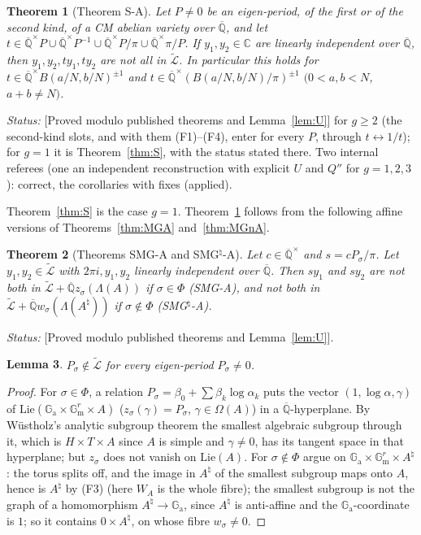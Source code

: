 \documentclass[11pt]{amsart}
\newtheorem{theorem}{Theorem}[section]
\newtheorem{lemma}[theorem]{Lemma}
\theoremstyle{definition}
\newcommand{\Qb}{\overline{\mathbb{Q}}}
\newcommand{\C}{\mathbb{C}}
\newcommand{\Ga}{\mathbb{G}_{\mathrm a}}
\newcommand{\Gm}{\mathbb{G}_{\mathrm m}}
\newcommand{\Lt}{\widetilde{\mathcal{L}}}
\newcommand{\lab}[1]{\textup{[#1]}}
\newcommand{\LabC}{\lab{Proved modulo published theorems and Lemma~\ref{lem:U}}}
\newcommand{\Status}{\noindent\emph{Status:} }
\begin{document}
\begin{theorem}[Theorem S-A]\label{thm:SA}
Let $P\neq0$ be an eigen-period, of the first or of the second kind, of a CM abelian variety over $\Qb$, and let
$t\in\Qb^\times P\cup\Qb^\times P^{-1}\cup\Qb^\times P/\pi\cup\Qb^\times\pi/P$. If $y_1,y_2\in\C$ are linearly independent
over $\Qb$, then $y_1,y_2,ty_1,ty_2$ are not all in $\Lt$. In particular this holds for $t\in\Qb^\times B(a/N,b/N)^{\pm1}$
and $t\in\Qb^\times(B(a/N,b/N)/\pi)^{\pm1}$ $(0<a,b<N$, $a+b\neq N)$.
\end{theorem}

\Status \LabC{} for $g\ge2$ (the second-kind slots, and with them (F1)--(F4), enter for every $P$, through
$t\leftrightarrow1/t$); for
$g=1$ it is Theorem~\ref{thm:S}, with the status stated there. Two internal referees (one an independent reconstruction
with explicit $U$ and $Q''$ for $g=1,2,3$): correct, the corollaries with fixes (applied).

\noindent Theorem~\ref{thm:S} is the case $g=1$. Theorem~\ref{thm:SA} follows from the following affine versions of
Theorems~\ref{thm:MGA} and~\ref{thm:MGnA}.

\begin{theorem}[Theorems SMG-A and SMG$^\natural$-A]\label{thm:SMGA}
Let $c\in\Qb^\times$ and $s=cP_\sigma/\pi$. Let $y_1,y_2\in\Lt$ with $2\pi i,y_1,y_2$ linearly independent over $\Qb$.
Then $sy_1$ and $sy_2$ are not both in $\Lt+\Qb z_\sigma(\Lambda(A))$ if $\sigma\in\Phi$ (SMG-A), and not both in
$\Lt+\Qb w_\sigma(\Lambda(A^\natural))$ if $\sigma\notin\Phi$ (SMG$^\natural$-A).
\end{theorem}

\Status \LabC.

\begin{lemma}\label{lem:PnotinL}
$P_\sigma\notin\Lt$ for every eigen-period $P_\sigma\neq0$.
\end{lemma}

\begin{proof}
For $\sigma\in\Phi$, a relation $P_\sigma=\beta_0+\sum\beta_k\log\alpha_k$ puts the vector $(1,\log\alpha,\gamma)$ of
$\mathrm{Lie}(\Ga\times\Gm^r\times A)$ ($z_\sigma(\gamma)=P_\sigma$, $\gamma\in\Omega(A)$) in a $\Qb$-hyperplane. By
W\"ustholz's analytic subgroup theorem \cite{Wu89} the smallest algebraic subgroup through it, which is $H\times T\times A$
since $A$ is simple and $\gamma\neq0$, has its tangent space in that hyperplane; but $z_\sigma$ does not vanish on
$\mathrm{Lie}(A)$. For $\sigma\notin\Phi$ argue on $\Ga\times\Gm^r\times A^\natural$: the torus splits off, and the image in
$A^\natural$ of the smallest subgroup maps onto $A$, hence is $A^\natural$ by (F3) (here $W_A$ is the whole fibre); the
smallest subgroup is not the graph of a homomorphism $A^\natural\to\Ga$, since $A^\natural$ is anti-affine and the
$\Ga$-coordinate is $1$; so it contains $0\times A^\natural$, on whose fibre $w_\sigma\neq0$.
\end{proof}
\end{document}
